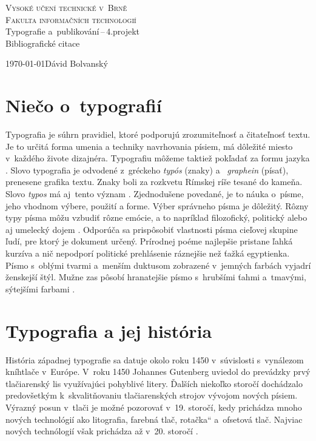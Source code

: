 \documentclass[a4paper,11pt, titlepage]{article}
\newcommand{\myuv}[1]{\quotedblbase #1\textquotedblleft}
\begin{document}
	
	\begin{titlepage}
		\begin{center}
			{\Huge\textsc{Vysoké učení technické v~Brně}}\\
			\vspace{+0.8em}
			{\huge\textsc{Fakulta informačních technologií}}\\
			\bigskip
			\LARGE{Typografie a~publikování\,--\,4.projekt}\\
			\vspace{-0.25em}
			\Huge{Bibliografické citace}
		\end{center}
		{\Large \today \hfill Dávid Bolvanský}
	\end{titlepage}

\newpage
\pagestyle{plain}

\section{Niečo o~typografií}
Typografia je súhrn pravidiel, ktoré podporujú zrozumiteľnosť a čitateľnosť textu. Je to určitá forma umenia a techniky navrhovania písiem, má dôležité miesto v~každého živote dizajnéra. Typografiu môžeme taktiež pokľadať za formu jazyka \cite{Lupton:Thinking_with_type}. Slovo typografia je odvodené z~gréckeho \emph{typós} (znaky) a~ \emph{graphein} (písať), prenesene grafika textu. Znaky boli za rozkvetu Rímskej ríše tesané do kameňa. Slovo \emph{typos} má aj~tento význam \cite{Olsak:Typografie_co_to_je}.
 Zjednodušene povedané, je to náuka o~písme, jeho vhodnom výbere, použití a forme. Výber správneho písma je dôležitý. Rôzny typy písma môžu vzbudiť rôzne emócie, a to napríklad filozofický, politický alebo aj umelecký dojem \cite{Ambrose:Typografie}. Odporúča sa prispôsobiť vlastnosti písma cieľovej skupine ľudí, pre ktorý je dokument určený. Prírodnej poéme najlepšie pristane ľahká kurzíva a nič nepodporí politické prehlásenie ráznejšie než ťažká egyptienka. Písmo s~oblými tvarmi a~menším duktusom zobrazené v~jemných farbách vyjadrí ženskejší štýl. Mužne zas pôsobí hranatejšie písmo s~hrubšími ťahmi a~tmavými, sýtejšími farbami \cite{Saltz:Zaklady_typografie}.

\section{Typografia a jej história}
História západnej typografie sa datuje okolo roku 1450 v~súvislosti s~vynálezom kníhtlače v~Európe. V~roku 1450 Johannes Gutenberg uviedol do
prevádzky prvý tlačiarenský lis využívajúci pohyblivé litery. Ďalších niekoľko storočí dochádzalo predovšetkým k~skvalitňovaniu tlačiarenských
strojov vývojom nových písiem. Výrazný posun v~tlači je možné pozorovať v~19. storočí, kedy prichádza mnoho nových technológií ako 
litografia, farebná tlač, \myuv{rotačka} a~ofsetová tlač. Najviac nových technólogií však prichádza až v~20. storočí \cite{Jirasek:Bakalarska_praca}.
\end{document}
